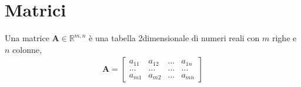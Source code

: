 \documentclass[letterpaper,10pt,italian]{jupyterBook}
\begin{document}
\section{Matrici}
\label{\detokenize{ch/algebra/linear-algebra:matrici}}\label{\detokenize{ch/algebra/linear-algebra:math-hs-algebra-linear-matrices}}
\sphinxAtStartPar
{} Una matrice \(\mathbf{A} \in \mathbb{R}^{m,n}\) è una tabella 2\sphinxhyphen{}dimensionale di numeri reali con \(m\) righe e \(n\) colonne,
\begin{equation*}
\begin{split}
\mathbf{A} =
\begin{bmatrix}
a_{11} & a_{12} & \dots & a_{1n} \\
\dots  & \dots  & \dots & \dots  \\
a_{m1} & a_{m2} & \dots & a_{mn}
\end{bmatrix}
\end{split}
\end{equation*}
\end{document}
